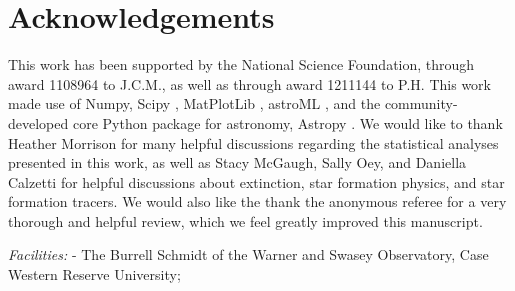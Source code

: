 \documentclass[iop]{emulateapj}
\begin{document}
\section{Acknowledgements}

This work has been supported by the National Science Foundation,
through award 1108964 to J.C.M., as well as through award 1211144 to
P.H.  This work made use of Numpy, Scipy \citep{oliphant07},
MatPlotLib \citep{hunter07}, astroML \citep{vanderplas12}, and the
community-developed core Python package for astronomy, Astropy
\citep{astropy13}.  We would like to thank Heather Morrison for
many helpful discussions regarding the statistical analyses presented
in this work, as well as Stacy McGaugh, Sally Oey, and Daniella
Calzetti for helpful discussions about extinction, star formation
physics, and star formation tracers.  We would also like the
  thank the anonymous referee for a very thorough and helpful review,
  which we feel greatly improved this manuscript.

{\it Facilities:}
 - The Burrell Schmidt of the Warner and Swasey
Observatory, Case Western Reserve University; 

\begin{thebibliography}{}



\end{thebibliography}
\end{document}

